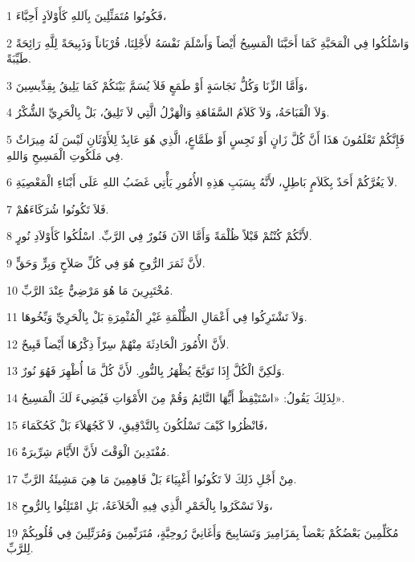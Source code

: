 \par 1 فَكُونُوا مُتَمَثِّلِينَ بِاَللهِ كَأَوْلاَدٍ أَحِبَّاءَ،
\par 2 وَاسْلُكُوا فِي الْمَحَبَّةِ كَمَا أَحَبَّنَا الْمَسِيحُ أَيْضاً وَأَسْلَمَ نَفْسَهُ لأَجْلِنَا، قُرْبَاناً وَذَبِيحَةً لِلَّهِ رَائِحَةً طَيِّبَةً.
\par 3 وَأَمَّا الزِّنَا وَكُلُّ نَجَاسَةٍ أَوْ طَمَعٍ فَلاَ يُسَمَّ بَيْنَكُمْ كَمَا يَلِيقُ بِقِدِّيسِينَ،
\par 4 وَلاَ الْقَبَاحَةُ، وَلاَ كَلاَمُ السَّفَاهَةِ وَالْهَزْلُ الَّتِي لاَ تَلِيقُ، بَلْ بِالْحَرِيِّ الشُّكْرُ.
\par 5 فَإِنَّكُمْ تَعْلَمُونَ هَذَا أَنَّ كُلَّ زَانٍ أَوْ نَجِسٍ أَوْ طَمَّاعٍ، الَّذِي هُوَ عَابِدٌ لِلأَوْثَانِ لَيْسَ لَهُ مِيرَاثٌ فِي مَلَكُوتِ الْمَسِيحِ وَاللهِ.
\par 6 لاَ يَغُرَّكُمْ أَحَدٌ بِكَلاَمٍ بَاطِلٍ، لأَنَّهُ بِسَبَبِ هَذِهِ الأُمُورِ يَأْتِي غَضَبُ اللهِ عَلَى أَبْنَاءِ الْمَعْصِيَةِ.
\par 7 فَلاَ تَكُونُوا شُرَكَاءَهُمْ.
\par 8 لأَنَّكُمْ كُنْتُمْ قَبْلاً ظُلْمَةً وَأَمَّا الآنَ فَنُورٌ فِي الرَّبِّ. اسْلُكُوا كَأَوْلاَدِ نُورٍ.
\par 9 لأَنَّ ثَمَرَ الرُّوحِ هُوَ فِي كُلِّ صَلاَحٍ وَبِرٍّ وَحَقٍّ.
\par 10 مُخْتَبِرِينَ مَا هُوَ مَرْضِيٌّ عِنْدَ الرَّبِّ.
\par 11 وَلاَ تَشْتَرِكُوا فِي أَعْمَالِ الظُّلْمَةِ غَيْرِ الْمُثْمِرَةِ بَلْ بِالْحَرِيِّ وَبِّخُوهَا.
\par 12 لأَنَّ الأُمُورَ الْحَادِثَةَ مِنْهُمْ سِرّاً ذِكْرُهَا أَيْضاً قَبِيحٌ.
\par 13 وَلَكِنَّ الْكُلَّ إِذَا تَوَبَّخَ يُظْهَرُ بِالنُّورِ. لأَنَّ كُلَّ مَا أُظْهِرَ فَهُوَ نُورٌ.
\par 14 لِذَلِكَ يَقُولُ: «اسْتَيْقِظْ أَيُّهَا النَّائِمُ وَقُمْ مِنَ الأَمْوَاتِ فَيُضِيءَ لَكَ الْمَسِيحُ».
\par 15 فَانْظُرُوا كَيْفَ تَسْلُكُونَ بِالتَّدْقِيقِ، لاَ كَجُهَلاَءَ بَلْ كَحُكَمَاءَ،
\par 16 مُفْتَدِينَ الْوَقْتَ لأَنَّ الأَيَّامَ شِرِّيرَةٌ.
\par 17 مِنْ أَجْلِ ذَلِكَ لاَ تَكُونُوا أَغْبِيَاءَ بَلْ فَاهِمِينَ مَا هِيَ مَشِيئَةُ الرَّبِّ.
\par 18 وَلاَ تَسْكَرُوا بِالْخَمْرِ الَّذِي فِيهِ الْخَلاَعَةُ، بَلِ امْتَلِئُوا بِالرُّوحِ،
\par 19 مُكَلِّمِينَ بَعْضُكُمْ بَعْضاً بِمَزَامِيرَ وَتَسَابِيحَ وَأَغَانِيَّ رُوحِيَّةٍ، مُتَرَنِّمِينَ وَمُرَتِّلِينَ فِي قُلُوبِكُمْ لِلرَّبِّ.
